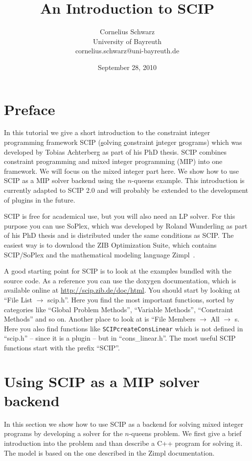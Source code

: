 \documentclass[a4paper]{article}
\title{An Introduction to SCIP}
\author{Cornelius Schwarz \\ University of Bayreuth \\ cornelius.schwarz@uni-bayreuth.de}
\date{September 28, 2010}
\begin{document}
\maketitle

\section{Preface}

In this tutorial we give a short introduction to the constraint integer programming framework SCIP 
(\underline{s}olving \underline{c}onstraint \underline{i}nteger \underline{p}rograms) which was developed 
by Tobias Achterberg \cite{scip} as part of his PhD thesis. SCIP combines constraint programming and mixed 
integer programming (MIP) into one framework. We will focus on the mixed integer part here. 
We show how to use SCIP as a MIP solver backend using the $n$-queens example.
This introduction is currently adapted to SCIP 2.0 and will probably be extended to the development of 
plugins in the future.

SCIP is free for academical use, but you will also need an LP solver. For this purpose you can use SoPlex, 
which was developed by Roland Wunderling \cite{soplex} as part of his PhD thesis and is distributed under 
the same conditions as SCIP. The easiest way is to download the ZIB Optimization Suite, which contains 
SCIP/SoPlex and the mathematical modeling language Zimpl~\cite{zimpl}.

A good starting point for SCIP is to look at the examples bundled with the source code. As a reference you 
can use the doxygen documentation, which is available online at \url{http://scip.zib.de/doc/html}. 
You should start by looking at ``File List $\rightarrow$ scip.h''. Here you find the most important functions, 
sorted by categories like ``Global Problem Methods'', ``Variable Methods'', ``Constraint Methods'' and so on. 
Another place to look at is ``File Members $\rightarrow$ All $\rightarrow$ s. Here you also find functions like 
\verb+SCIPcreateConsLinear+ which is not defined in ``scip.h'' -- since it is a plugin -- but in 
``cons\_linear.h''. The most useful SCIP functions start with the prefix ``SCIP''.


\section{Using SCIP as a MIP solver backend}

In this section we show how to use SCIP as a backend for solving mixed integer programs by developing a solver 
for the $n$-queens problem. We first give a brief introduction into the problem and than describe a C++ program 
for solving it. The model is based on the one described in the Zimpl documentation.
\end{document}

